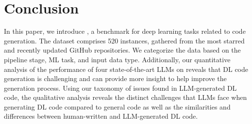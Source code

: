 \section{Conclusion}
In this paper, we introduce \tool, a benchmark for deep learning tasks related to code generation. The dataset comprises 520 instances, gathered from the most starred and recently updated GitHub repositories. We categorize the data based on the pipeline stage, ML task, and input data type. 
Additionally, our quantitative analysis of the performance of four state-of-the-art LLMs on \tool reveals that DL code generation is challenging and \tool can provide more insight to help improve the generation process.
Using our taxonomy of issues found in LLM-generated DL code, the qualitative analysis reveals the distinct challenges that LLMs face when generating DL code compared to general code as well as the similarities and differences between human-written and LLM-generated DL code.


